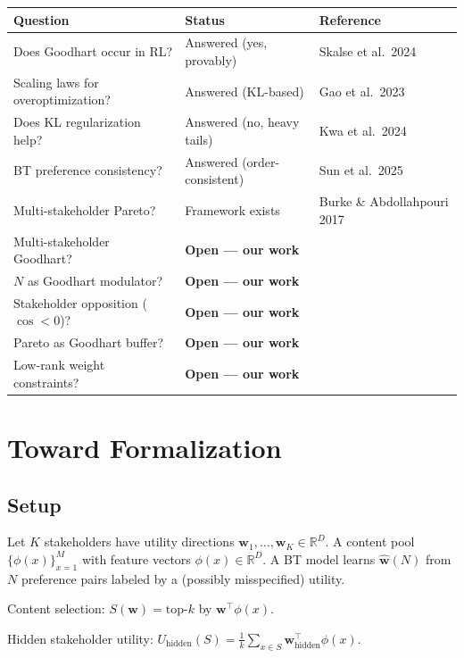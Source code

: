 \documentclass[11pt]{article}
\begin{document}
\begin{center}
\begin{tabular}{lp{6cm}l}
\toprule
\textbf{Question} & \textbf{Status} & \textbf{Reference} \\
\midrule
Does Goodhart occur in RL? & Answered (yes, provably)
  & Skalse et al.\ 2024 \\
Scaling laws for overoptimization? & Answered (KL-based)
  & Gao et al.\ 2023 \\
Does KL regularization help? & Answered (no, heavy tails)
  & Kwa et al.\ 2024 \\
BT preference consistency? & Answered (order-consistent)
  & Sun et al.\ 2025 \\
Multi-stakeholder Pareto? & Framework exists
  & Burke \& Abdollahpouri 2017 \\
\midrule
Multi-stakeholder Goodhart? & \textbf{Open --- our work} & \\
$N$ as Goodhart modulator? & \textbf{Open --- our work} & \\
Stakeholder opposition ($\cos < 0$)? & \textbf{Open --- our work} & \\
Pareto as Goodhart buffer? & \textbf{Open --- our work} & \\
Low-rank weight constraints? & \textbf{Open --- our work} & \\
\bottomrule
\end{tabular}
\end{center}

\section{Toward Formalization}

\subsection{Setup}

Let $K$ stakeholders have utility directions
$\mathbf{w}_1, \ldots, \mathbf{w}_K \in \mathbb{R}^D$. A content pool
$\{\phi(x)\}_{x=1}^M$ with feature vectors $\phi(x) \in \mathbb{R}^D$.
A BT model learns $\hat{\mathbf{w}}(N)$ from $N$ preference pairs
labeled by a (possibly misspecified) utility.

Content selection: $S(\mathbf{w}) = \text{top-}k$ by
$\mathbf{w}^\top \phi(x)$.

Hidden stakeholder utility:
$U_{\text{hidden}}(S) = \frac{1}{k} \sum_{x \in S} \mathbf{w}_{\text{hidden}}^\top \phi(x)$.
\end{document}
